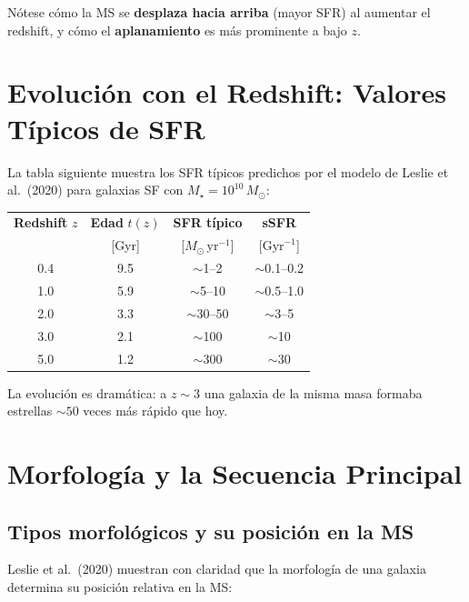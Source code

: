 \documentclass[12pt, a4paper]{article}
\begin{document}
Nótese cómo la MS se \textbf{desplaza hacia arriba} (mayor SFR) al aumentar
el redshift, y cómo el \textbf{aplanamiento} es más prominente a bajo $z$.

\section{Evolución con el Redshift: Valores Típicos de SFR}

La tabla siguiente muestra los SFR típicos predichos por el modelo de
Leslie et al.\ (2020) para galaxias SF con $M_\star = 10^{10}\,M_\odot$:

\begin{center}
\begin{tabular}{cccc}
\toprule
\textbf{Redshift} $z$ & \textbf{Edad} $t(z)$ & \textbf{SFR típico} & \textbf{sSFR} \\
& [Gyr] & [$M_\odot\,\mathrm{yr}^{-1}$] & [$\mathrm{Gyr}^{-1}$] \\
\midrule
0.4 & 9.5 & $\sim$1--2   & $\sim$0.1--0.2 \\
1.0 & 5.9 & $\sim$5--10  & $\sim$0.5--1.0 \\
2.0 & 3.3 & $\sim$30--50 & $\sim$3--5 \\
3.0 & 2.1 & $\sim$100    & $\sim$10 \\
5.0 & 1.2 & $\sim$300    & $\sim$30 \\
\bottomrule
\end{tabular}
\end{center}

La evolución es dramática: a $z \sim 3$ una galaxia de la misma masa
formaba estrellas $\sim 50$ veces más rápido que hoy.

\section{Morfología y la Secuencia Principal}

\subsection{Tipos morfológicos y su posición en la MS}

Leslie et al.\ (2020) muestran con claridad que la morfología de una galaxia
determina su posición relativa en la MS:
\end{document}
